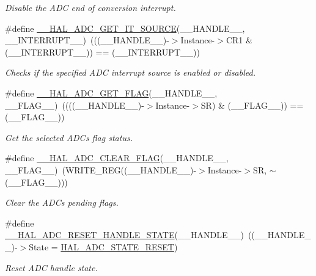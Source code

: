 \begin{DoxyCompactItemize}
\begin{DoxyCompactList}\small\item\em Disable the A\+DC end of conversion interrupt. \end{DoxyCompactList}\item 
\#define \hyperlink{group___a_d_c___exported___macros_gaf29cd943cb451e4ed1f07bd7d4854fb0}{\+\_\+\+\_\+\+H\+A\+L\+\_\+\+A\+D\+C\+\_\+\+G\+E\+T\+\_\+\+I\+T\+\_\+\+S\+O\+U\+R\+CE}(\+\_\+\+\_\+\+H\+A\+N\+D\+L\+E\+\_\+\+\_\+,  \+\_\+\+\_\+\+I\+N\+T\+E\+R\+R\+U\+P\+T\+\_\+\+\_\+)~(((\+\_\+\+\_\+\+H\+A\+N\+D\+L\+E\+\_\+\+\_\+)-\/$>$Instance-\/$>$C\+R1 \& (\+\_\+\+\_\+\+I\+N\+T\+E\+R\+R\+U\+P\+T\+\_\+\+\_\+)) == (\+\_\+\+\_\+\+I\+N\+T\+E\+R\+R\+U\+P\+T\+\_\+\+\_\+))
\begin{DoxyCompactList}\small\item\em Checks if the specified A\+DC interrupt source is enabled or disabled. \end{DoxyCompactList}\item 
\#define \hyperlink{group___a_d_c___exported___macros_gaff951862689bb92173f803577cf2d447}{\+\_\+\+\_\+\+H\+A\+L\+\_\+\+A\+D\+C\+\_\+\+G\+E\+T\+\_\+\+F\+L\+AG}(\+\_\+\+\_\+\+H\+A\+N\+D\+L\+E\+\_\+\+\_\+,  \+\_\+\+\_\+\+F\+L\+A\+G\+\_\+\+\_\+)~((((\+\_\+\+\_\+\+H\+A\+N\+D\+L\+E\+\_\+\+\_\+)-\/$>$Instance-\/$>$SR) \& (\+\_\+\+\_\+\+F\+L\+A\+G\+\_\+\+\_\+)) == (\+\_\+\+\_\+\+F\+L\+A\+G\+\_\+\+\_\+))
\begin{DoxyCompactList}\small\item\em Get the selected A\+DC\textquotesingle{}s flag status. \end{DoxyCompactList}\item 
\#define \hyperlink{group___a_d_c___exported___macros_gafe44e1e66141bca3665bb82981a81a17}{\+\_\+\+\_\+\+H\+A\+L\+\_\+\+A\+D\+C\+\_\+\+C\+L\+E\+A\+R\+\_\+\+F\+L\+AG}(\+\_\+\+\_\+\+H\+A\+N\+D\+L\+E\+\_\+\+\_\+,  \+\_\+\+\_\+\+F\+L\+A\+G\+\_\+\+\_\+)~(W\+R\+I\+T\+E\+\_\+\+R\+EG((\+\_\+\+\_\+\+H\+A\+N\+D\+L\+E\+\_\+\+\_\+)-\/$>$Instance-\/$>$SR, $\sim$(\+\_\+\+\_\+\+F\+L\+A\+G\+\_\+\+\_\+)))
\begin{DoxyCompactList}\small\item\em Clear the A\+DC\textquotesingle{}s pending flags. \end{DoxyCompactList}\item 
\#define \hyperlink{group___a_d_c___exported___macros_gacb290bae25b972942021331122a3600f}{\+\_\+\+\_\+\+H\+A\+L\+\_\+\+A\+D\+C\+\_\+\+R\+E\+S\+E\+T\+\_\+\+H\+A\+N\+D\+L\+E\+\_\+\+S\+T\+A\+TE}(\+\_\+\+\_\+\+H\+A\+N\+D\+L\+E\+\_\+\+\_\+)~((\+\_\+\+\_\+\+H\+A\+N\+D\+L\+E\+\_\+\+\_\+)-\/$>$State = \hyperlink{group___a_d_c___exported___types_ga3f995b6dedd7366d0663f852511b9104}{H\+A\+L\+\_\+\+A\+D\+C\+\_\+\+S\+T\+A\+T\+E\+\_\+\+R\+E\+S\+ET})
\begin{DoxyCompactList}\small\item\em Reset A\+DC handle state. \end{DoxyCompactList}\end{DoxyCompactItemize}


